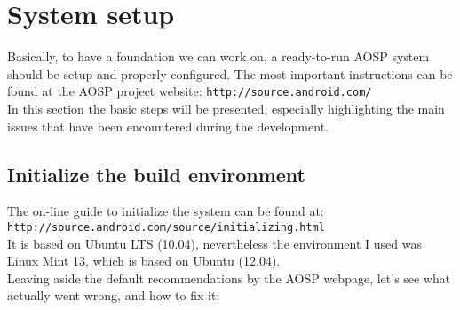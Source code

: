 \section{System setup}
\label{setup}
Basically, to have a foundation we can work on, a ready-to-run AOSP system should be setup and properly configured. The most important instructions can be found at the AOSP project website: \texttt{http://source.android.com/}\\
In this section the basic steps will be presented, especially highlighting the main issues that have been encountered during the development.
\subsection{Initialize the build environment}
The on-line guide to initialize the system can be found at:\\
\texttt{http://source.android.com/source/initializing.html}\\
It is based on Ubuntu LTS (10.04), nevertheless the environment I used was Linux Mint 13, which is based on Ubuntu (12.04).\\
Leaving aside the default recommendations by the AOSP webpage, let's see what actually went wrong, and how to fix it:
